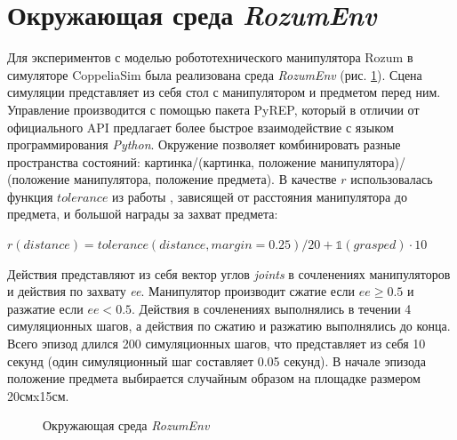 \documentclass{mipt-thesis-bs}
\begin{document}
\section{Окружающая среда \textit{RozumEnv}}

Для экспериментов с моделью робототехнического манипулятора Rozum в симуляторе CoppeliaSim была реализована среда \textit{RozumEnv} (рис. \ref{rozum}). Сцена симуляции представляет из себя стол с манипулятором и предметом перед ним. Управление производится с помощью пакета PyREP, который в отличии от официального API предлагает более быстрое взаимодействие с языком программирования \textit{Python}. Окружение позволяет комбинировать разные пространства состояний: картинка/(картинка, положение манипулятора)/ (положение манипулятора, положение предмета). В качестве $r$ использовалась функция $tolerance$ из работы \cite{deepmind suite}, зависящей от расстояния манипулятора до предмета, и большой награды за захват предмета:
\begin{center}
$r(distance) = tolerance(distance, margin=0.25)/20 + \mathds{1}(grasped)\cdot 10$
\end{center}

Действия представляют из себя вектор углов \textit{joints} в сочленениях манипуляторов и действия по захвату \textit{ee}. Манипулятор производит сжатие если $ee\geq 0.5$ и разжатие если $ee< 0.5$. Действия в сочленениях выполнялись в течении 4 симуляционных шагов, а действия по сжатию и разжатию выполнялись до конца. Всего эпизод длился 200 симуляционных шагов, что представляет из себя 10 секунд (один симуляционный шаг составляет 0.05 секунд). В начале эпизода положение предмета выбирается случайным образом на площадке размером 20смx15см.


\begin{figure}[ht]
    \centering
    \vspace{-0.2cm}
    \caption{Окружающая среда \textit{RozumEnv}}
    \label{rozum}
\end{figure}
\end{document}
